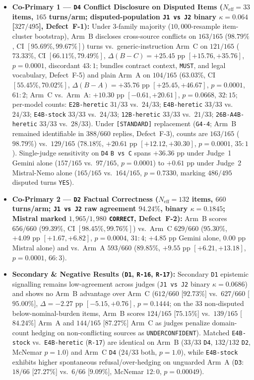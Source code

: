 \documentclass[11pt,a4paper]{article}
\begin{document}
\begin{itemize}
    \item \textbf{Co-Primary 1 --- \texttt{D4} Conflict Disclosure on Disputed Items ($N_{\text{eff}} = 33$ items, $165$ turns/arm; disputed-population \texttt{J1 vs J2} binary $\kappa = \mathbf{0.064}$ [$327/495$], Defect~F-1):} Under 3-family majority ($10{,}000$-resample item-cluster bootstrap), Arm~B discloses cross-source conflicts on $163/165$ ($98.79\%$, CI $[95.69\%, 99.67\%]$) turns vs.\ generic-instruction Arm~C on $121/165$ ($73.33\%$, CI $[66.11\%, 79.49\%]$, $\Delta(B-C) = +25.45\text{ pp}$ $[+15.76, +35.76]$, $p = 0.0001$, discordant $43:1$; bundles contract context, \texttt{MUST}, and legal vocabulary, Defect~F-5) and plain Arm~A on $104/165$ ($63.03\%$, CI $[55.45\%, 70.02\%]$, $\Delta(B-A) = +35.76\text{ pp}$ $[+25.45, +46.67]$, $p = 0.0001$, $61:2$; Arm~C vs.\ Arm~A: $+10.30\text{ pp}$ $[-0.61, +20.61]$, $p = 0.0668$, $32:15$; per-model counts: \texttt{E2B-heretic} $31/33$ vs.\ $24/33$; \texttt{E4B-heretic} $33/33$ vs.\ $24/33$; \texttt{E4B-stock} $33/33$ vs.\ $24/33$; \texttt{12B-heretic} $33/33$ vs.\ $21/33$; \texttt{26B-A4B-heretic} $33/33$ vs.\ $28/33$). Under \texttt{[STANDARD]} replacement (\texttt{G4-4}; Arm~B remained identifiable in $388/660$ replies, Defect~F-3), counts are $163/165$ ($98.79\%$) vs.\ $129/165$ ($78.18\%$, $+20.61\text{ pp}$ $[+12.12, +30.30]$, $p = 0.0001$, $35:1$). Single-judge sensitivity on \texttt{D4} \texttt{B vs C} spans $+36.36\text{ pp}$ under Judge~1 Gemini alone ($157/165$ vs.\ $97/165$, $p = 0.0001$) to $+0.61\text{ pp}$ under Judge~2 Mistral-Nemo alone ($165/165$ vs.\ $164/165$, $p = 0.7330$, marking $486/495$ disputed turns \texttt{YES}).
    \item \textbf{Co-Primary 2 --- \texttt{D2} Factual Correctness ($N_{\text{eff}} = 132$ items, $660$ turns/arm; \texttt{J1 vs J2} raw agreement $94.24\%$, binary $\kappa = 0.1845$; Mistral marked $1{,}965/1{,}980$ \texttt{CORRECT}, Defect~F-2):} Arm~B scores $656/660$ ($99.39\%$, CI $[98.45\%, 99.76\%]$) vs.\ Arm~C $629/660$ ($95.30\%$, $+4.09\text{ pp}$ $[+1.67, +6.82]$, $p = 0.0004$, $31:4$; $+4.85\text{ pp}$ Gemini alone, $0.00\text{ pp}$ Mistral alone) and vs.\ Arm~A $593/660$ ($89.85\%$, $+9.55\text{ pp}$ $[+6.21, +13.18]$, $p = 0.0001$, $66:3$).
    \item \textbf{Secondary \& Negative Results (\texttt{D1}, \texttt{R-16}, \texttt{R-17}):} Secondary \texttt{D1} epistemic signalling remains low-agreement across judges (\texttt{J1 vs J2} binary $\kappa = 0.0686$) and shows no Arm~B advantage over Arm~C ($612/660$ [$92.73\%$] vs.\ $627/660$ [$95.00\%$], $\Delta = -2.27\text{ pp}$ $[-5.15, +0.76]$, $p = 0.1444$; on the $33$ non-disputed below-nominal-burden items, Arm~B scores $124/165$ [$75.15\%$] vs.\ $139/165$ [$84.24\%$] Arm~A and $144/165$ [$87.27\%$] Arm~C as judges penalize domain-count hedging on non-conflicting sources as \texttt{UNDERCONFIDENT}). Matched \texttt{E4B-stock} vs.\ \texttt{E4B-heretic} (\texttt{R-17}) are identical on Arm~B ($33/33$ \texttt{D4}, $132/132$ \texttt{D2}, McNemar $p = 1.0$) and Arm~C \texttt{D4} ($24/33$ both, $p = 1.0$), while \texttt{E4B-stock} exhibits higher spontaneous refusal/over-hedging on unguarded Arm~A (\texttt{D3}: $18/66$ [$27.27\%$] vs.\ $6/66$ [$9.09\%$], McNemar $12:0$, $p = 0.00049$).

\end{itemize}
\end{document}
